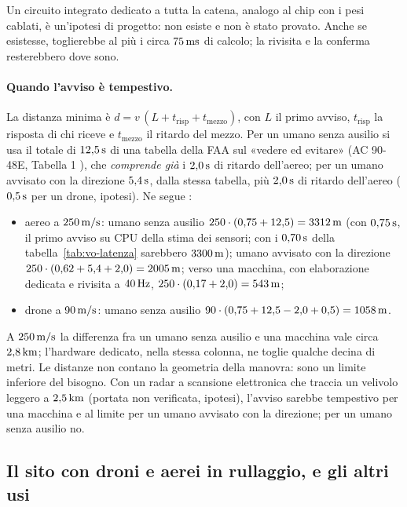 Un circuito integrato dedicato a tutta la catena, analogo al chip con i pesi cablati, è un'ipotesi di progetto: non esiste e non è stato provato. Anche se esistesse, toglierebbe al più i circa $75\,\mathrm{ms}$ di calcolo; la rivisita e la conferma resterebbero dove sono.

\paragraph{Quando l'avviso è tempestivo.} La distanza minima è $d=v\,(L+t_{\mathrm{risp}}+t_{\mathrm{mezzo}})$, con $L$ il primo avviso, $t_{\mathrm{risp}}$ la risposta di chi riceve e $t_{\mathrm{mezzo}}$ il ritardo del mezzo. Per un umano senza ausilio si usa il totale di $12{,}5\,\mathrm{s}$ di una tabella della FAA sul «vedere ed evitare» (AC 90-48E, Tabella 1 \citep{faa-ac-90-48e}), che \emph{comprende già} i $2{,}0\,\mathrm{s}$ di ritardo dell'aereo; per un umano avvisato con la direzione $5{,}4\,\mathrm{s}$, dalla stessa tabella, più $2{,}0\,\mathrm{s}$ di ritardo dell'aereo ($0{,}5\,\mathrm{s}$ per un drone, ipotesi). Ne segue :
\begin{itemize}
\item aereo a $250\,\mathrm{m/s}$: umano senza ausilio $250\cdot(0{,}75+12{,}5)=3312\,\mathrm{m}$ (con $0{,}75\,\mathrm{s}$, il primo avviso su CPU della stima dei sensori; con i $0{,}70\,\mathrm{s}$ della tabella~\ref{tab:vo-latenza} sarebbero $3300\,\mathrm{m}$); umano avvisato con la direzione $250\cdot(0{,}62+5{,}4+2{,}0)=2005\,\mathrm{m}$; verso una macchina, con elaborazione dedicata e rivisita a $40\,\mathrm{Hz}$, $250\cdot(0{,}17+2{,}0)=543\,\mathrm{m}$;
\item drone a $90\,\mathrm{m/s}$: umano senza ausilio $90\cdot(0{,}75+12{,}5-2{,}0+0{,}5)=1058\,\mathrm{m}$.
\end{itemize}
A $250\,\mathrm{m/s}$ la differenza fra un umano senza ausilio e una macchina vale circa $2{,}8\,\mathrm{km}$; l'hardware dedicato, nella stessa colonna, ne toglie qualche decina di metri. Le distanze non contano la geometria della manovra: sono un limite inferiore del bisogno. Con un radar a scansione elettronica che traccia un velivolo leggero a $2{,}5\,\mathrm{km}$ (portata non verificata, ipotesi), l'avviso sarebbe tempestivo per una macchina e al limite per un umano avvisato con la direzione; per un umano senza ausilio no.

\subsection{Il sito con droni e aerei in rullaggio, e gli altri usi}\label{sec:vo-altri}

